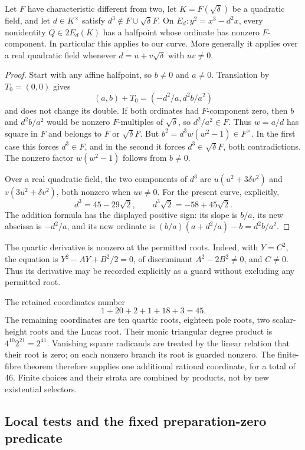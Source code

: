 \begin{lemma}
Let $F$ have characteristic different from two, let
$K=F(\sqrt\delta)$ be a quadratic field, and let $d\in K^\times$
satisfy $d^3\notin F\cup\sqrt\delta F$. On
$E_d:y^2=x^3-d^2x$, every nonidentity $Q\in2E_d(K)$ has a
halfpoint whose ordinate has nonzero $F$-component. In particular
this applies to our curve. More generally it applies over a real
quadratic field whenever $d=u+v\sqrt\delta$ with $uv\ne0$.
\end{lemma}
\begin{proof}
Start with any affine halfpoint, so $b\ne0$ and $a\ne0$.
Translation by $T_0=(0,0)$ gives
\[
 (a,b)+T_0=(-d^2/a,d^2b/a^2)
\]
and does not change its double. If both ordinates had $F$-component
zero, then
$b$ and $d^2b/a^2$ would be nonzero $F$-multiples of $\sqrt\delta$,
so $d^2/a^2\in F$. Thus $w=a/d$ has square in $F$ and belongs to
$F$ or $\sqrt\delta F$. But $b^2=d^3w(w^2-1)\in F^\times$.
In the first case this forces $d^3\in F$, and in the second it
forces $d^3\in\sqrt\delta F$, both contradictions. The nonzero
factor $w(w^2-1)$ follows from $b\ne0$.

Over a real quadratic field, the two components of
$d^3$ are $u(u^2+3\delta v^2)$ and $v(3u^2+\delta v^2)$,
both nonzero when $uv\ne0$. For the present curve, explicitly,
\[
 d^3=45-29\sqrt2,\qquad
 d^3\sqrt2=-58+45\sqrt2.
\]
The addition formula has the displayed positive sign: its slope is
$b/a$, its new abscissa is $-d^2/a$, and its new ordinate is
$(b/a)(a+d^2/a)-b=d^2b/a^2$.
\end{proof}

The quartic derivative is nonzero at the permitted roots. Indeed,
with $Y=C^2$, the equation is $Y^2-AY+B^2/2=0$, of discriminant
$A^2-2B^2\ne0$, and $C\ne0$. Thus its derivative may be recorded
explicitly as a guard without excluding any permitted root.

The retained coordinates number
\[
 1+20+2+1+18+3=45.
\]
The remaining coordinates are ten quartic roots, eighteen pole roots,
two scalar-height roots and the Lucas root. Their monic triangular
degree product is $4^{10}2^{21}=2^{41}$. Vanishing square radicands
are treated by the linear relation that their root is zero; on each
nonzero branch its root is guarded nonzero. The finite-fibre theorem
therefore supplies one additional rational coordinate, for a total of
46. Finite choices and their strata are combined by products, not by
new existential selectors.

\subsection{Local tests and the fixed preparation-zero predicate}

